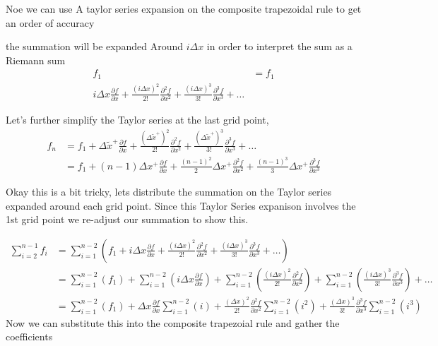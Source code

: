 \documentclass[12pt]{article}
\begin{document}
Noe we can use A taylor series expansion on the composite trapezoidal rule to
get an order of accuracy

the summation will be expanded Around $ i \Delta x$ in order to interpret the sum 
as a Riemann sum
\begin{align*}
    f_1  &= f_1\\
    i\Delta x \frac{\partial f }{\partial x } +
    \frac{(i\Delta x)^2}{2!} \frac{\partial^2 f }{\partial x^2 } +
    \frac{(i\Delta x)^3}{3!} \frac{\partial^3 f }{\partial x^3 } + \dots
\end{align*}

Let's further simplify the Taylor series at the last grid point,
\begin{align*} 
    f_n &= f_1 + 
    \Delta \widetilde{x}^+\frac{\partial f }{\partial x  } +
    \frac{(\Delta \widetilde{x}^+)^2}{2!}\frac{\partial^2 f }{\partial x^2  } +
    \frac{(\Delta \widetilde{x}^+)^3}{3!}\frac{\partial^3 f }{\partial x^3  } + \dots \\
        &= 
        f_1 +
        \left( n - 1 \right)\Delta x^+ 
        \frac{\partial f}{\partial x} +
        \frac{\left( n - 1 \right)^2}{2}\Delta x^+ 
        \frac{\partial^2 f}{\partial x^2} +
        \frac{\left( n - 1 \right)^3}{3}\Delta x^+ 
        \frac{\partial^3 f}{\partial x^3}
\end{align*}

Okay this is a bit tricky, lets distribute the summation on the Taylor series 
expanded around each grid point. Since this Taylor Series expanison involves 
the 1st grid point we re-adjust our summation to show this.

\begin{align*}
    \sum_{i = 2}^{n - 1} f_i  &= 
    \sum_{i = 1}^{n - 2} \left( 
    f_1 +
    i\Delta x \frac{\partial f }{\partial x } +
    \frac{(i\Delta x)^2}{2!} \frac{\partial^2 f }{\partial x^2 } +
    \frac{(i\Delta x)^3}{3!} \frac{\partial^3 f }{\partial x^3 } + \dots
    \right) \\
                              &=
    \sum_{i = 1}^{n - 2} \left( 
    f_1 \right) +
    \sum_{i = 1}^{n - 2} \left( 
    i\Delta x \frac{\partial f }{\partial x }\right) +
    \sum_{i = 1}^{n - 2} \left( 
    \frac{(i\Delta x)^2}{2!} \frac{\partial^2 f }{\partial x^2 } \right)+
    \sum_{i = 1}^{n - 2} \left( 
    \frac{(i\Delta x)^3}{3!} \frac{\partial^3 f }{\partial x^3 } \right)+ \dots\\ 
                              &=
    \sum_{i = 1}^{n - 2} \left( 
    f_1 \right) +
 \Delta x \frac{\partial f }{\partial x }   
     \sum_{i = 1}^{n - 2} \left( i\right) +
    \frac{(\Delta x)^2}{2!} \frac{\partial^2 f }{\partial x^2 } 
    \sum_{i = 1}^{n - 2} \left( i^2 \right)
    +
    \frac{(\Delta x)^3}{3!} \frac{\partial^3 f }{\partial x^3 } 
    \sum_{i = 1}^{n - 2} \left( i^3 \right)
\end{align*} 
Now we can  substitute this into the composite trapezoial rule and gather the coefficients 
\end{document}

